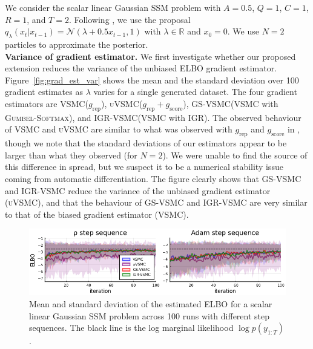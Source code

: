 \documentclass[12pt]{article}
\newcommand{\vsmc}{\textsc{VSMC}\xspace}
\newcommand{\uvsmc}{\textsc{uVSMC}\xspace}
\newcommand{\gsvsmc}{\textsc{GS-VSMC}\xspace}
\newcommand{\igrvsmc}{\textsc{IGR-VSMC}\xspace}
\newcommand{\elbo}{\textsc{ELBO}\xspace}
\newcommand{\grep}{g_{\mathrm{rep}}}
\newcommand{\gscore}{g_{\mathrm{score}}}
\newcommand{\gumbelsoftmax}{\textsc{Gumbel-Softmax}\xspace}
\newcommand{\igr}{\textsc{IGR}\xspace}
\newcommand{\ssm}{\textsc{SSM}\xspace}
\begin{document}
We consider the scalar linear Gaussian \ssm problem with $A=0.5$, $Q=1$, $C=1$, $R=1$, and $T=2$. Following \textcite{Naesseth:2018}, we use the proposal $q_\lambda(x_t|x_{t-1}) = \mathcal{N}(\lambda+0.5x_{t-1}, 1)$ with $\lambda\in\mathbb{R}$ and $x_0=0$. We use $N=2$ particles to approximate the posterior.
\\

\textbf{Variance of gradient estimator.} We first investigate whether our proposed extension reduces the variance of the unbiased \elbo gradient estimator. Figure~\ref{fig:grad_est_var} shows the mean and the standard deviation over 100 gradient estimates as $\lambda$ varies for a single generated dataset. The four gradient estimators are \vsmc ($\grep$), \uvsmc ($\grep+\gscore$), \gsvsmc (\vsmc with \gumbelsoftmax), and \igrvsmc (\vsmc with \igr). The observed behaviour of \vsmc and \uvsmc are similar to what was observed with $\grep$ and $\gscore$ in \parencite{Naesseth:2018}, though we note that the standard deviations of our estimators appear to be larger than what they observed (for $N=2$). We were unable to find the source of this difference in spread, but we suspect it to be a numerical stability issue coming from automatic differentiation. The figure clearly shows that \gsvsmc and \igrvsmc reduce the variance of the unbiased gradient estimator (\uvsmc), and that the behaviour of \gsvsmc and \igrvsmc are very similar to that of the biased gradient estimator (\vsmc).
\\

\begin{figure}[t]
\centering
\includegraphics[width=\textwidth]{figures/slgss_elbo.png}
\caption{Mean and standard deviation of the estimated \elbo for a scalar linear Gaussian \ssm problem across 100 runs with different step sequences. The black line is the log marginal likelihood $\log p(y_{1:T})$.}
\label{fig:slgss_elbo}
\end{figure}
\end{document}
